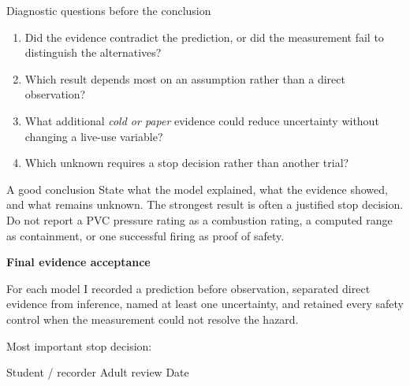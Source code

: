 \begin{teloscard}{Diagnostic questions before the conclusion}
\begin{enumerate}
\item Did the evidence contradict the prediction, or did the measurement fail
to distinguish the alternatives? \hrulefill
\item Which result depends most on an assumption rather than a direct
observation? \hrulefill
\item What additional \emph{cold or paper} evidence could reduce uncertainty
without changing a live-use variable? \hrulefill
\item Which unknown requires a stop decision rather than another trial?
\hrulefill
\end{enumerate}
\end{teloscard}

\begin{telospanel}{A good conclusion}
State what the model explained, what the evidence showed, and what remains
unknown. The strongest result is often a justified stop decision. Do not report
a PVC pressure rating as a combustion rating, a computed range as containment,
or one successful firing as proof of safety.
\end{telospanel}

\begin{telosframe}
\textbf{Final evidence acceptance}\par
For each model I recorded a prediction before observation, separated direct
evidence from inference, named at least one uncertainty, and retained every
safety control when the measurement could not resolve the hazard.\par
\vspace{.6em}
Most important stop decision: \hrulefill\par\vspace{.6em}
Student / recorder \hrulefill\quad Adult review \hrulefill\quad Date \hrulefill
\end{telosframe}

